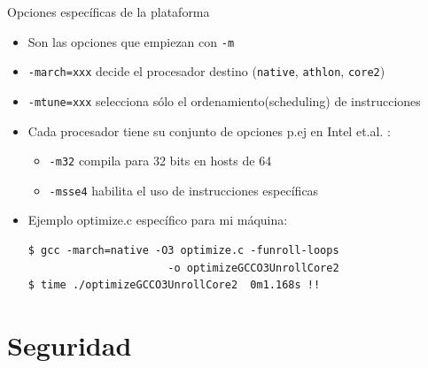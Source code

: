 \documentclass[xetex]{beamer}
\begin{document}
\begin{frame}[fragile]{Opciones específicas de la plataforma}
\begin{itemize}
  \item Son las opciones que empiezan con \verb=-m=
  \item \verb#-march=xxx# decide el procesador destino (\verb=native=, \verb=athlon=, \verb=core2=)
  \item \verb#-mtune=xxx# selecciona sólo el ordenamiento(scheduling) de instrucciones
  \item Cada procesador tiene su conjunto de opciones p.ej en Intel et.al. :
\begin{itemize}
  \item \verb=-m32= compila para 32 bits en hosts de 64
  \item \verb=-msse4= habilita el uso de instrucciones específicas
\end{itemize}
  \item Ejemplo optimize.c específico para mi máquina:
\begin{verbatim}
$ gcc -march=native -O3 optimize.c -funroll-loops 
                      -o optimizeGCCO3UnrollCore2
$ time ./optimizeGCCO3UnrollCore2  0m1.168s !!
\end{verbatim}
\end{itemize}
\end{frame}

\section{Seguridad}
\end{document}
